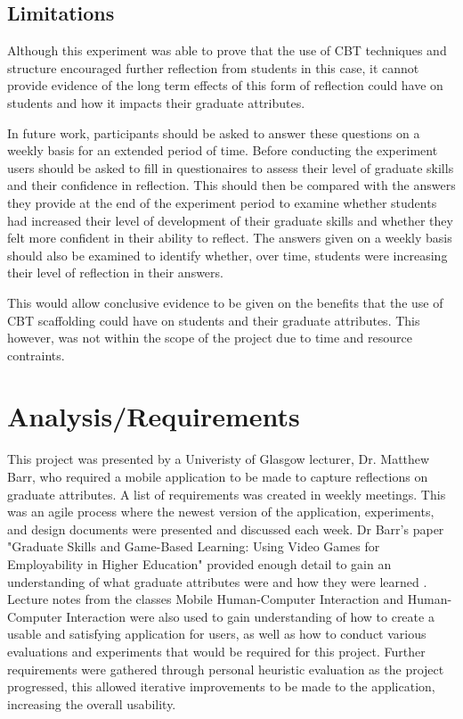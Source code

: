 \documentclass{l4proj}
\begin{document}
\section{Limitations}

Although this experiment was able to prove that the use of CBT techniques and structure encouraged further reflection from students in this case, it cannot provide evidence of the long term effects of this form of reflection could have on students and how it impacts their graduate attributes. 

In future work, participants should be asked to answer these questions on a weekly basis for an extended period of time. Before conducting the experiment users should be asked to fill in questionaires to assess their level of graduate skills and their confidence in reflection. This should then be compared with the answers they provide at the end of the experiment period to examine whether students had increased their level of development of their graduate skills and whether they felt more confident in their ability to reflect. The answers given on a weekly basis should also be examined to identify whether, over time, students were increasing their level of reflection in their answers. 

This would allow conclusive evidence to be given on the benefits that the use of CBT scaffolding could have on students and their graduate attributes. This however, was not within the scope of the project due to time and resource contraints. 



\chapter{Analysis/Requirements} \label{analysis/reqs}

This project was presented by a Univeristy of Glasgow lecturer, Dr. Matthew Barr, who required a mobile application to be made to capture reflections on graduate attributes. A list of requirements was created in weekly meetings. This was an agile process where the newest version of the application, experiments, and design documents were presented and discussed each week. Dr Barr's paper "Graduate Skills and Game-Based Learning: Using Video Games for Employability in Higher Education" provided enough detail to gain an understanding of what graduate attributes were and how they were learned \citep{barr_2019}. Lecture notes from the classes Mobile Human-Computer Interaction and Human-Computer Interaction were also used to gain understanding of how to create a usable and satisfying application for users, as well as how to conduct various evaluations and experiments that would be required for this project. Further requirements were gathered through personal heuristic evaluation as the project progressed, this allowed iterative improvements to be made to the application, increasing the overall usability.
\end{document}
